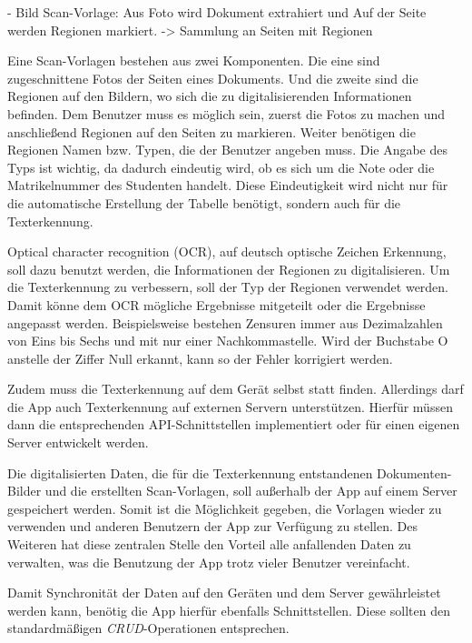 \documentclass[nomenclature, oneside, 150]{HSMW-Thesis}
\begin{document}
	- Bild Scan-Vorlage: Aus Foto wird Dokument extrahiert und Auf der Seite werden Regionen markiert. -> Sammlung an Seiten mit Regionen
	
	Eine Scan-Vorlagen bestehen aus zwei Komponenten. Die eine sind zugeschnittene Fotos der Seiten eines Dokuments. Und die zweite sind die Regionen auf den Bildern, wo sich die zu digitalisierenden Informationen befinden. Dem Benutzer muss es möglich sein, zuerst die Fotos zu machen und anschließend Regionen auf den Seiten zu markieren. Weiter benötigen die Regionen Namen bzw. Typen, die der Benutzer angeben muss. Die Angabe des Typs ist wichtig, da dadurch eindeutig wird, ob es sich um die Note oder die Matrikelnummer des Studenten handelt. Diese Eindeutigkeit wird nicht nur für die automatische Erstellung der Tabelle benötigt, sondern auch für die Texterkennung. 
	
	Optical character recognition (OCR), auf deutsch optische Zeichen Erkennung, soll dazu benutzt werden, die Informationen der Regionen zu digitalisieren. Um die Texterkennung zu verbessern, soll der Typ der Regionen verwendet werden. Damit könne dem OCR mögliche Ergebnisse mitgeteilt oder die Ergebnisse angepasst werden. Beispielsweise bestehen Zensuren immer aus Dezimalzahlen von Eins bis Sechs und mit nur einer Nachkommastelle. Wird der Buchstabe O anstelle der Ziffer Null erkannt, kann so der Fehler korrigiert werden.
	
	Zudem muss die Texterkennung auf dem Gerät selbst statt finden. Allerdings darf die App auch Texterkennung auf externen Servern unterstützen. Hierfür müssen dann die entsprechenden API-Schnittstellen implementiert oder für einen eigenen Server entwickelt werden.

	Die digitalisierten Daten, die für die Texterkennung entstandenen Dokumenten-Bilder und die erstellten Scan-Vorlagen, soll außerhalb der App auf einem Server gespeichert werden. Somit ist die Möglichkeit gegeben, die Vorlagen wieder zu verwenden und anderen Benutzern der App zur Verfügung zu stellen. Des Weiteren hat diese zentralen Stelle den Vorteil alle anfallenden Daten zu verwalten, was die Benutzung der App trotz vieler Benutzer vereinfacht.
	
	Damit Synchronität der Daten auf den Geräten und dem Server gewährleistet werden kann, benötig die App hierfür ebenfalls Schnittstellen. Diese sollten den standardmäßigen \textit{CRUD}-Operationen entsprechen. 
	
\end{document}
